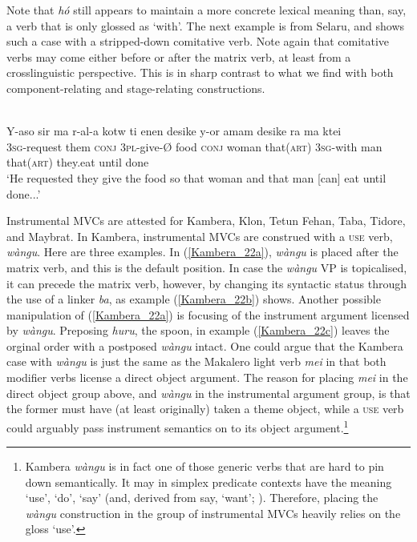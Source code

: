 Note that \textit{hó} still appears to maintain a more concrete lexical meaning than, say, a verb that is only glossed as `with'. The next example is from Selaru, and shows such a case with a stripped-down comitative verb. Note again that comitative verbs may come either before or after the matrix verb, at least from a crosslinguistic perspective. This is in sharp contrast to what we find with both component-relating and stage-relating constructions.

\ea 
{}\\
\gll Y-aso sir ma r-al-a kotw ti enen desike y-or amam desike ra ma ktei \\
3\textsc{sg}-request them \textsc{conj} 3\textsc{pl}-give-Ø food \textsc{conj} woman that(\textsc{art}) 3\textsc{sg}-with man that(\textsc{art}) they.eat until done \\
\glft `He requested they give the food so that woman and that man [can] eat until done...'\\ 
\z

Instrumental MVCs are attested for Kambera, Klon, Tetun Fehan, Taba, Tidore, and Maybrat. In Kambera, instrumental MVCs are construed with a \textsc{use} verb, \textit{wàngu}. Here are three examples. In (\ref{Kambera_22a}), \textit{wàngu} is placed after the matrix verb, and this is the default position. In case the \textit{wàngu} VP is topicalised, it can precede the matrix verb, however, by changing its syntactic status through the use of a linker \textit{ba}, as example (\ref{Kambera_22b}) shows. Another possible manipulation of (\ref{Kambera_22a}) is focusing of the instrument argument licensed by \textit{wàngu}. Preposing \textit{huru}, the spoon, in example (\ref{Kambera_22c}) leaves the orginal order with a postposed \textit{wàngu} intact. One could argue that the Kambera case with \textit{wàngu} is just the same as the Makalero light verb \textit{mei} in that both modifier verbs license a direct object argument. The reason for placing \textit{mei} in the direct object group above, and \textit{wàngu} in the instrumental argument group, is that the former must have (at least originally) taken a theme object, while a \textsc{use} verb could arguably pass instrument semantics on to its object argument.\footnote{Kambera \textit{wàngu} is in fact one of those generic verbs that are hard to pin down semantically. It may in simplex predicate contexts have the meaning `use', `do', `say' (and, derived from say, `want'; \citealt[284ff.]{klamer1998grammar}). Therefore, placing the \textit{wàngu} construction in the group of instrumental MVCs heavily relies on the gloss `use'.}

